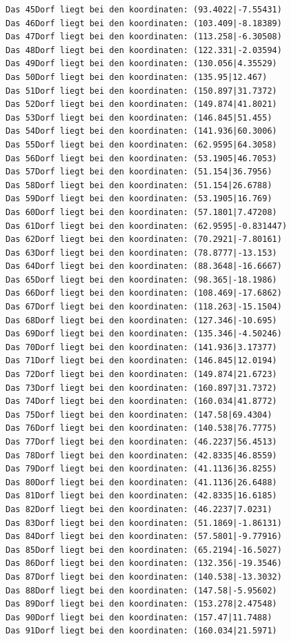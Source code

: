 \documentclass{article}
\begin{document}
\begin{verbatim}
Das 45Dorf liegt bei den koordinaten: (93.4022|-7.55431)
Das 46Dorf liegt bei den koordinaten: (103.409|-8.18389)
Das 47Dorf liegt bei den koordinaten: (113.258|-6.30508)
Das 48Dorf liegt bei den koordinaten: (122.331|-2.03594)
Das 49Dorf liegt bei den koordinaten: (130.056|4.35529)
Das 50Dorf liegt bei den koordinaten: (135.95|12.467)
Das 51Dorf liegt bei den koordinaten: (150.897|31.7372)
Das 52Dorf liegt bei den koordinaten: (149.874|41.8021)
Das 53Dorf liegt bei den koordinaten: (146.845|51.455)
Das 54Dorf liegt bei den koordinaten: (141.936|60.3006)
Das 55Dorf liegt bei den koordinaten: (62.9595|64.3058)
Das 56Dorf liegt bei den koordinaten: (53.1905|46.7053)
Das 57Dorf liegt bei den koordinaten: (51.154|36.7956)
Das 58Dorf liegt bei den koordinaten: (51.154|26.6788)
Das 59Dorf liegt bei den koordinaten: (53.1905|16.769)
Das 60Dorf liegt bei den koordinaten: (57.1801|7.47208)
Das 61Dorf liegt bei den koordinaten: (62.9595|-0.831447)
Das 62Dorf liegt bei den koordinaten: (70.2921|-7.80161)
Das 63Dorf liegt bei den koordinaten: (78.8777|-13.153)
Das 64Dorf liegt bei den koordinaten: (88.3648|-16.6667)
Das 65Dorf liegt bei den koordinaten: (98.365|-18.1986)
Das 66Dorf liegt bei den koordinaten: (108.469|-17.6862)
Das 67Dorf liegt bei den koordinaten: (118.263|-15.1504)
Das 68Dorf liegt bei den koordinaten: (127.346|-10.695)
Das 69Dorf liegt bei den koordinaten: (135.346|-4.50246)
Das 70Dorf liegt bei den koordinaten: (141.936|3.17377)
Das 71Dorf liegt bei den koordinaten: (146.845|12.0194)
Das 72Dorf liegt bei den koordinaten: (149.874|21.6723)
Das 73Dorf liegt bei den koordinaten: (160.897|31.7372)
Das 74Dorf liegt bei den koordinaten: (160.034|41.8772)
Das 75Dorf liegt bei den koordinaten: (147.58|69.4304)
Das 76Dorf liegt bei den koordinaten: (140.538|76.7775)
Das 77Dorf liegt bei den koordinaten: (46.2237|56.4513)
Das 78Dorf liegt bei den koordinaten: (42.8335|46.8559)
Das 79Dorf liegt bei den koordinaten: (41.1136|36.8255)
Das 80Dorf liegt bei den koordinaten: (41.1136|26.6488)
Das 81Dorf liegt bei den koordinaten: (42.8335|16.6185)
Das 82Dorf liegt bei den koordinaten: (46.2237|7.0231)
Das 83Dorf liegt bei den koordinaten: (51.1869|-1.86131)
Das 84Dorf liegt bei den koordinaten: (57.5801|-9.77916)
Das 85Dorf liegt bei den koordinaten: (65.2194|-16.5027)
Das 86Dorf liegt bei den koordinaten: (132.356|-19.3546)
Das 87Dorf liegt bei den koordinaten: (140.538|-13.3032)
Das 88Dorf liegt bei den koordinaten: (147.58|-5.95602)
Das 89Dorf liegt bei den koordinaten: (153.278|2.47548)
Das 90Dorf liegt bei den koordinaten: (157.47|11.7488)
Das 91Dorf liegt bei den koordinaten: (160.034|21.5971)

\end{verbatim}
\end{document}
